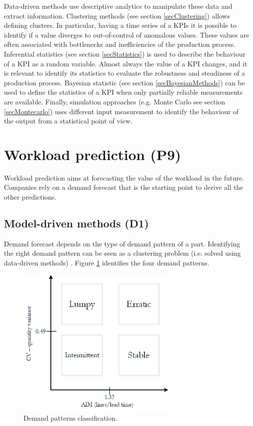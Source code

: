 Data-driven methods use descriptive analytics to manipulate these data and extract information. Clustering methods (see section \ref{secClustering}) allows defining clusters. In particular, having a time series of a KPIs it is possible to identify if a value diverges to out-of-control of anomalous values. These values are often associated with bottlenecks and inefficiencies of the production process. Inferential statistics (see section \ref{secStatistics}) is used to describe the behaviour of a KPI as a random variable. Almost always the value of a KPI changes, and it is relevant to identify its statistics to evaluate the robustness and steadiness of a production process. Bayesian statistic (see section \ref{secBayesianMethods}) can be used to define the statistics of a KPI when only partially reliable measurements are available. Finally, simulation approaches (e.g. Monte Carlo see section \ref{secMontecarlo}) uses different input measurement to identify the behaviour of the output from a statistical point of view.  

\section{Workload prediction (P9)} \label{secWorkloadPredictionProd}
Workload prediction aims at forecasting the value of the workload in the future. Companies rely on a demand forecast that is the starting point to derive all the other predictions. 

\subsection{Model-driven methods (D1)} \label{secDemandPatterns}
Demand forecast depends on the type of demand pattern of a part. Identifying the right demand pattern can be seen as a clustering problem (i.e. solved using data-driven methods) \cite{Mikalsen}. Figure \ref{fig_prod_demand_pattern} identifies the four demand patterns.

\begin{figure}[hbt!]
\centering
\includegraphics[width=0.7\textwidth]{sectionProduction/control_figures/fig_prod_demand_pattern.png}
\captionsetup{type=figure}
\caption{Demand patterns classification.}
\label{fig_prod_demand_pattern}
\end{figure}

